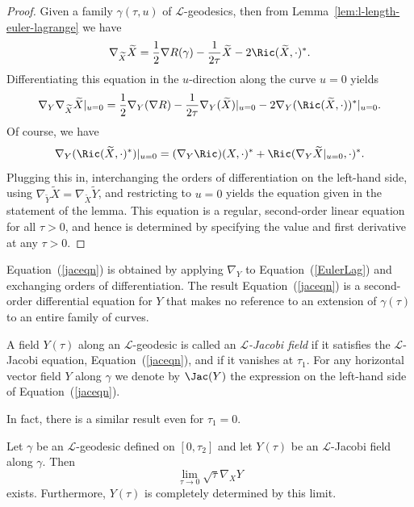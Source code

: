 \begin{proof}
Given a family $\gamma(\tau,u)$ of ${\mathcal L}$-geodesics, then
from Lemma~\ref{lem:l-length-euler-lagrange} we have
$$ \nabla_{\widetilde X}\widetilde X = \frac{1}{2}\nabla R(\gamma)
-\frac{1}{2\tau}\widetilde X - 2\Ric(\widetilde X,\cdot)^*.$$
Differentiating this equation in the $u$-direction along the curve
$u=0$ yields
$$\nabla_Y
\nabla_{\widetilde X}\widetilde X|_{u=0}=\frac{1}{2}\nabla_Y(\nabla
R)-\frac{1}{2\tau}\nabla_Y(\widetilde X)|_{u=0} -2\nabla_Y(\Ric(\widetilde X,\cdot))^*|_{u=0}.$$ Of course, we have
$$\nabla_Y(\Ric(\widetilde X,\cdot)^*)|_{u=0}=(\nabla_Y\Ric)(X,\cdot)^*
+\Ric(\nabla_Y\widetilde X|_{u=0},\cdot)^*.$$ Plugging this in,
interchanging the orders of differentiation on the left-hand side, using
$\nabla_{\widetilde Y}\widetilde X=\nabla_{\widetilde X}\widetilde Y$, and
restricting to $u=0$ yields the equation given in the statement of the lemma.
This equation is a regular, second-order linear equation  for all $\tau>0$, and
hence is determined by specifying the value and first derivative at any
$\tau>0$.
\end{proof}

Equation~(\ref{jaceqn}) is obtained by applying $\nabla_Y$ to
Equation~(\ref{EulerLag}) and exchanging orders of differentiation.
The result Equation~(\ref{jaceqn}) is a second-order differential
equation for $Y$ that makes no reference to an extension of
$\gamma(\tau)$ to an entire family of curves.



\begin{definition}\label{def:l-jacobi-field}
A field $Y(\tau)$ along an ${\mathcal L}$-geodesic is
called an {\em ${\mathcal L}$-Jacobi field} if it satisfies the ${\mathcal L}$-Jacobi
equation, Equation~(\ref{jaceqn}), and if it vanishes at $\tau_1$.
For any horizontal vector field $Y$ along $\gamma$ we denote by
$\Jac(Y)$ the expression on the left-hand
side of Equation~(\ref{jaceqn}).
\end{definition}

In fact, there is a similar result even for $\tau_1=0$.

\begin{lemma}\label{lem:l-jacobi-field-initial-limit}
Let $\gamma$ be an ${\mathcal L}$-geodesic defined on $[0,\tau_2]$
and let $Y(\tau)$ be an ${\mathcal L}$-Jacobi field along $\gamma$.
Then
$$\lim_{\tau\rightarrow 0}\sqrt{\tau}\nabla_XY$$
exists. Furthermore, $Y(\tau)$ is completely determined by this
limit.
\end{lemma}



